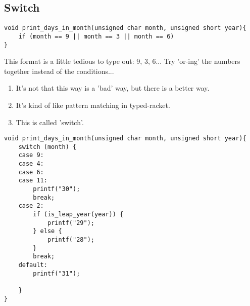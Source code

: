 \documentclass[12pt]{article}
\theoremstyle{definition}
\begin{document}
\subsection{Switch}
\begin{lstlisting}
void print_days_in_month(unsigned char month, unsigned short year){ 
    if (month == 9 || month == 3 || month == 6)    
}
\end{lstlisting}
\note This format is a little tedious to type out: 9, 3, 6...
\idea Try 'or-ing' the numbers together instead of the conditions...
\begin{enumerate}
    \item It's not that this way is a 'bad' way, but there is a better way. 
    \item It's kind of like pattern matching in typed-racket. 
    \item This is called 'switch'.
\end{enumerate}

\begin{lstlisting}
void print_days_in_month(unsigned char month, unsigned short year){ 
    switch (month) { 
    case 9: 
    case 4:
    case 6:
    case 11:
        printf("30");
        break;
    case 2:
        if (is_leap_year(year)) { 
            printf("29");
        } else {
            printf("28");
        }
        break;
    default:
        printf("31");

    }
}
\end{lstlisting}
\end{document}
